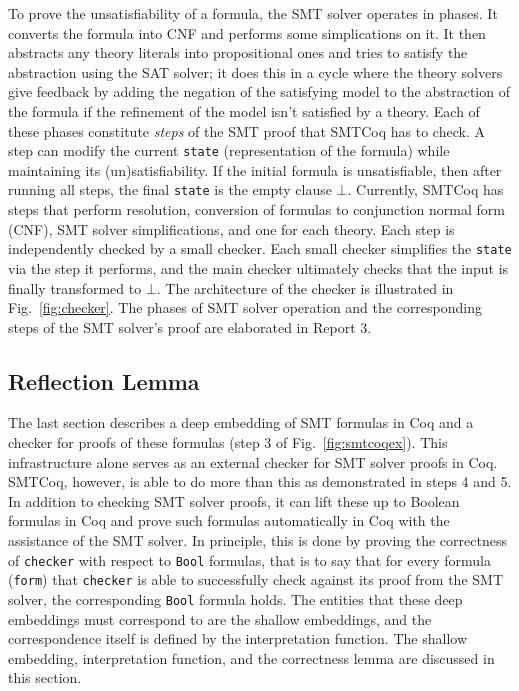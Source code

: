 \documentclass{article}
\begin{document}
	To prove the unsatisfiability of a 
	formula, the SMT solver operates in 
	phases. It converts the formula into
	CNF and performs some simplications
	on it. It then abstracts any theory
	literals into propositional ones 
	and tries to satisfy the abstraction 
	using the SAT solver; it does this
	in a cycle where the theory
	solvers give feedback
	by adding the negation of the 
	satisfying model to the 
	abstraction of the formula if the 
	refinement of the model isn't 
	satisfied by a theory. 
	Each of these phases constitute
	\textit{steps} of the SMT proof
	that SMTCoq has to check. A step
	can modify the current 
	\texttt{state} (representation of 
	the formula) while maintaining 
	its (un)satisfiability. If the 
	initial formula is unsatisfiable, 
	then after running all steps,
	the final \texttt{state} is the 
	empty clause $\bot$. Currently, 
	SMTCoq has steps that perform 
	resolution, conversion of formulas 
	to conjunction normal form (CNF), SMT 
	solver simplifications, and one for 
	each theory. Each step is 
	independently checked by a small 
	checker. Each small
	checker simplifies the  
	\texttt{state} via the step it 
	performs, and the main checker 
	ultimately checks that the input is 
	finally transformed to $\bot$. The 
	architecture of the checker is 
	illustrated in
	Fig.~\ref{fig:checker}. The phases 
	of SMT solver operation and the 
	corresponding steps of the
	SMT solver's proof are elaborated
	in Report 3.
	
	\subsection{Reflection Lemma}
	\label{sec:refl}
	The last section describes a 
	deep embedding of SMT formulas 
	in Coq and a checker for 
	proofs of these formulas (step 3 of 
	Fig.~\ref{fig:smtcoqex}). 
	This infrastructure alone serves 
	as an external checker for 
	SMT solver proofs in Coq.
	SMTCoq, however, is able to 
	do more than this as demonstrated
	in steps 4 and 5. In addition 
	to checking SMT solver proofs, 
	it can lift these up to 
	Boolean formulas in Coq and
	prove such formulas automatically
	in Coq with the assistance of 
	the SMT solver. In principle,
	this is done by proving the
	correctness of \texttt{checker}
	with respect to \texttt{Bool}
	formulas, that is to say that 
	for every formula (\texttt{form})
	that \texttt{checker} is able to 
	successfully check against its
	proof from the SMT solver, the 
	corresponding \texttt{Bool}
	formula holds. The entities
	that these deep embeddings 
	must correspond to are the shallow
	embeddings, and the correspondence 
	itself is defined by the 
	interpretation function. The 
	shallow embedding, interpretation
	function, and the correctness 
	lemma are discussed in this 
	section.
	
\end{document}
